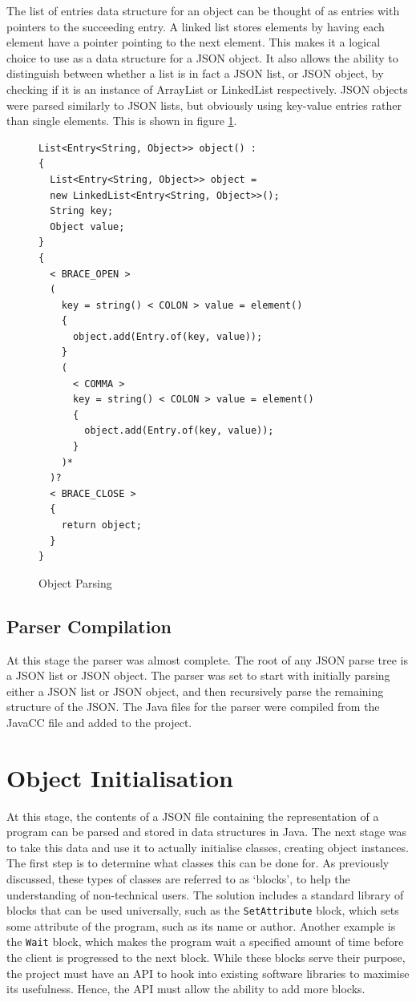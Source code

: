 The list of entries data structure for an object can be thought of as entries with pointers to the succeeding entry. A linked list stores elements by having each element have a pointer pointing to the next element. This makes it a logical choice to use as a data structure for a JSON object. It also allows the ability to distinguish between whether a list is in fact a JSON list, or JSON object, by checking if it is an instance of ArrayList or LinkedList respectively. JSON objects were parsed similarly to JSON lists, but obviously using key-value entries rather than single elements. This is shown in figure  \ref{fig:object_parsing}.
\begin{figure}
\centering
\caption{Object Parsing}
\label{fig:object_parsing}
\begin{verbatim}
List<Entry<String, Object>> object() :
{
  List<Entry<String, Object>> object =
  new LinkedList<Entry<String, Object>>();
  String key;
  Object value;
}
{
  < BRACE_OPEN >
  (
    key = string() < COLON > value = element()
    {
      object.add(Entry.of(key, value));
    }
    (
      < COMMA > 
      key = string() < COLON > value = element()
      {
        object.add(Entry.of(key, value));
      }
    )*
  )?
  < BRACE_CLOSE >
  {
    return object;
  }
}
\end{verbatim}
\end{figure}

\subsection{Parser Compilation}
At this stage the parser was almost complete. The root of any JSON parse tree is a JSON list or JSON object. The parser was set to start with initially parsing either a JSON list or JSON object, and then recursively parse the remaining structure of the JSON. The Java files for the parser were compiled from the JavaCC file and added to the project.

\section{Object Initialisation}

At this stage, the contents of a JSON file containing the representation of a program can be parsed and stored in data structures in Java. The next stage was to take this data and use it to actually initialise classes, creating object instances. The first step is to determine what classes this can be done for. As previously discussed, these types of classes are referred to as ‘blocks’, to help the understanding of non-technical users. The solution includes a standard library of blocks that can be used universally, such as the \texttt{SetAttribute} block, which sets some attribute of the program, such as its name or author. Another example is the \texttt{Wait} block, which makes the program wait a specified amount of time before the client is progressed to the next block. While these blocks serve their purpose, the project must have an API to hook into existing software libraries to maximise its usefulness. Hence, the API must allow the ability to add more blocks.\par
